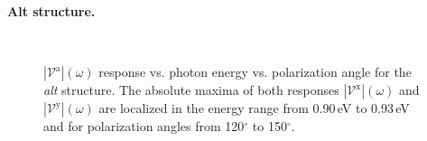 \documentclass[prb,11pt,tightenlines,twocolumn,aps]{revtex4-1}
\begin{document}
\textbf{Alt structure.}
\begin{figure}[tb]
    \centering
    \\
    
    \caption{$|\mathcal{V}^{\mathrm{a}}|(\omega)$ response vs. photon energy vs.
    polarization angle for the \emph{alt} structure. The absolute maxima of both
    responses $|\mathcal{V}^{\mathrm{x}}|(\omega)$ and
    $|\mathcal{V}^{\mathrm{y}}|(\omega)$ are localized in the energy range from
    0.90\,eV to 0.93\,eV and for polarization angles from 120$^{\circ}$ to
    150$^{\circ}$.}
    \label{fig:alt-3d-vva}
\end{figure}
\end{document}
